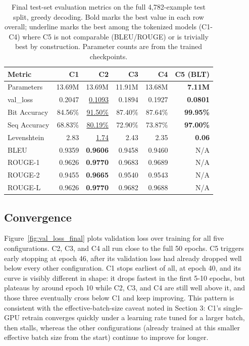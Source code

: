 \documentclass[12pt,a4paper]{article}
\begin{document}
\begin{table}[H]
\centering
\small
\begin{tabular}{lrrrrr}
\toprule
\textbf{Metric} & \textbf{C1} & \textbf{C2} & \textbf{C3} & \textbf{C4} & \textbf{C5 (BLT)} \\
\midrule
Parameters      & 13.69M & 13.69M & 11.91M & 13.68M & \textbf{7.11M} \\
val\_loss        & 0.2047 & \underline{0.1093} & 0.1894 & 0.1927 & \textbf{0.0801} \\
Bit Accuracy    & 84.56\% & \underline{91.50\%} & 87.40\% & 87.64\% & \textbf{99.95\%} \\
Seq Accuracy    & 68.83\% & \underline{80.19\%} & 72.90\% & 73.87\% & \textbf{97.00\%} \\
Levenshtein     & 2.83 & \underline{1.74} & 2.43 & 2.35 & \textbf{0.06} \\
BLEU            & 0.9359 & \textbf{0.9606} & 0.9458 & 0.9460 & N/A \\
ROUGE-1         & 0.9626 & \textbf{0.9770} & 0.9683 & 0.9689 & N/A \\
ROUGE-2         & 0.9455 & \textbf{0.9665} & 0.9540 & 0.9543 & N/A \\
ROUGE-L         & 0.9626 & \textbf{0.9770} & 0.9682 & 0.9688 & N/A \\
\bottomrule
\end{tabular}
\caption{Final test-set evaluation metrics on the full 4,782-example test split, greedy decoding. Bold marks the best value in each row overall; underline marks the best among the tokenized models (C1-C4) where C5 is not comparable (BLEU/ROUGE) or is trivially best by construction. Parameter counts are from the trained checkpoints.}
\label{tab:results}
\end{table}

\subsection{Convergence}

Figure~\ref{fig:val_loss_final} plots validation loss over training for all five configurations. C2, C3, and C4 all run close to the full 50 epochs. C5 triggers early stopping at epoch 46, after its validation loss had already dropped well below every other configuration. C1 stops earliest of all, at epoch 40, and its curve is visibly different in shape: it drops fastest in the first 5-10 epochs, but plateaus by around epoch 10 while C2, C3, and C4 are still well above it, and those three eventually cross below C1 and keep improving. This pattern is consistent with the effective-batch-size caveat noted in Section 3: C1's single-GPU retrain converges quickly under a learning rate tuned for a larger batch, then stalls, whereas the other configurations (already trained at this smaller effective batch size from the start) continue to improve for longer.
\end{document}
